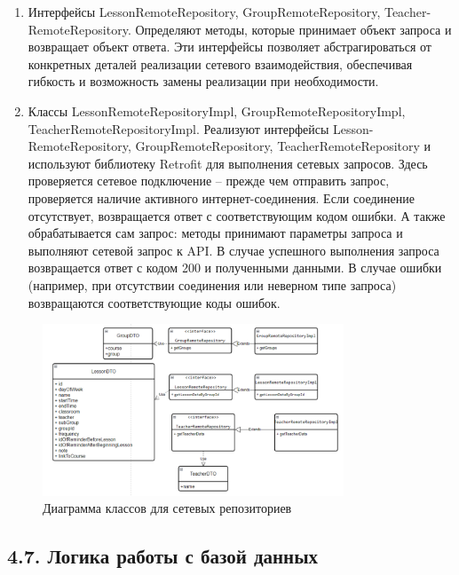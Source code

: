 \documentclass{vsureport}
\begin{document}
\begin{enumerate}
    \item Интерфейсы LessonRemoteRepository, GroupRemoteRepository, Teacher-RemoteRepository. Определяют методы, которые принимает объект запроса и возвращает объект ответа. Эти интерфейсы позволяет абстрагироваться от конкретных деталей реализации сетевого взаимодействия, обеспечивая гибкость и возможность замены реализации при необходимости.
	
    \item Классы LessonRemoteRepositoryImpl, GroupRemoteRepositoryImpl, TeacherRemoteRepositoryImpl. Реализуют интерфейсы Lesson-RemoteRepository, GroupRemoteRepository, TeacherRemoteRepository и используют библиотеку Retrofit для выполнения сетевых запросов. Здесь проверяется сетевое подключение – прежде чем отправить запрос, проверяется наличие активного интернет-соединения. Если соединение отсутствует, возвращается ответ с соответствующим кодом ошибки. А также обрабатывается сам запрос: методы принимают параметры запроса и выполняют сетевой запрос к API. В случае успешного выполнения запроса возвращается ответ с кодом 200 и полученными данными. В случае ошибки (например, при отсутствии соединения или неверном типе запроса) возвращаются соответствующие коды ошибок.\cite{ref9}
\end{enumerate}

\begin{figure}[H]
	\centering
	\includegraphics[width=0.8\textwidth]{7.png}
	\caption{Диаграмма классов для сетевых репозиториев}
	\label{fig:fig7}
\end{figure}

\subsection*{4.7. Логика работы с базой данных}
\end{document}
